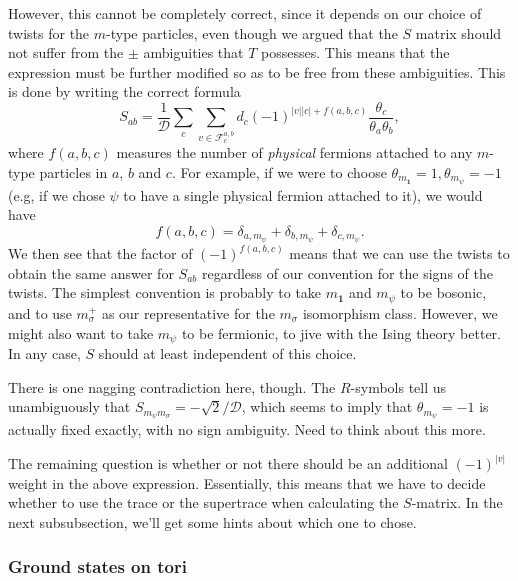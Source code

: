 \documentclass[12pt,a4paper]{article}
\newcommand{\tp}{\otimes}
\newcommand{\unit}{\mathbf{1}}
\newcommand{\mcd}{\mathcal{D}}
\newcommand\be            {\begin{equation}}
\newcommand\ee            {\end{equation}}
\newcommand{\fld}{\mathcal{F}}
\begin{document}
{{However, this cannot be completely correct, since it depends on our choice of twists for the $m$-type particles, even though we argued that the $S$ matrix should not suffer from the $\pm$ ambiguities that $T$ possesses. This means that the expression must be further modified so as to be free from these ambiguities. This is done by writing the correct formula
\be S_{ab} = \frac{1}{\mcd} \sum_c \sum_{v \in \fld^{a,b}_c} d_c (-1)^{|v| |c| + f(a,b,c)}   \frac{\theta_c}{\theta_a\theta_b},\ee
where $f(a,b,c)$ measures the number of {\it physical} fermions attached to any $m$-type particles in $a$, $b$ and $c$. For example, if we were to choose $\theta_{m_\unit} = 1, \theta_{m_\psi} = -1$ (e.g, if we chose $\psi$ to have a single physical fermion attached to it), we would have 
\be {f(a,b,c)} = \delta_{a,m_\psi} + \delta_{b,m_\psi} + \delta_{c,m_\psi}.\ee
We then see that the factor of $(-1)^{f(a,b,c)}$ means that we can use the twists to obtain the same answer for $S_{ab}$ regardless of our convention for the signs of the twists. The simplest convention is probably to take $m_\unit$ and $m_\psi$ to be bosonic, and to use $m_\sigma^+$ as our representative for the $m_\sigma$ isomorphism class. However, we might also want to take $m_\psi$ to be fermionic, to jive with the Ising theory better. In any case, $S$ should at least independent of this choice. 

There is one nagging contradiction here, though. The $R$-symbols tell us unambiguously that $S_{m_\psi m_\sigma} = -\sqrt{2}/\mcd$, which seems to imply that $\theta_{m_\psi} = -1$ is actually fixed exactly, with no sign ambiguity. Need to think about this more. 

The remaining question is whether or not there should be an additional $(-1)^{|v|}$ weight in the above expression. Essentially, this means that we have to decide whether to use the trace or the supertrace when calculating the $S$-matrix. In the next subsubsection, we'll get some hints about which one to chose. 

\subsubsection{Ground states on tori}

}}
\end{document}
